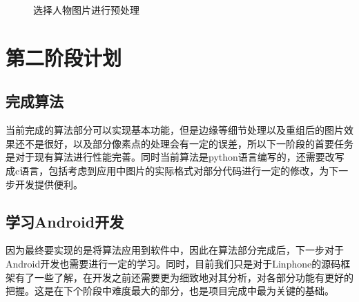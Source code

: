 \documentclass[14pt]{extarticle}
\newcommand{\<}{\langle}
\renewcommand{\>}{\rangle}
\theoremstyle{definition}
\begin{document}
\begin{itemize}
\begin{figure}[H]
{    }

    \caption{选择人物图片进行预处理}
\end{figure}
\end{itemize}

\section{第二阶段计划}
\subsection{完成算法}
\par{\qquad 当前完成的算法部分可以实现基本功能，但是边缘等细节处理以及重组后的图片效果还不是很好，以及部分像素点的处理会有一定的误差，所以下一阶段的首要任务是对于现有算法进行性能完善。同时当前算法是python语言编写的，还需要改写成c语言，包括考虑到应用中图片的实际格式对部分代码进行一定的修改，为下一步开发提供便利。}
\subsection{学习Android开发}
\par{\qquad 因为最终要实现的是将算法应用到软件中，因此在算法部分完成后，下一步对于Android开发也需要进行一定的学习。同时，目前我们只是对于Linphone的源码框架有了一些了解，在开发之前还需要更为细致地对其分析，对各部分功能有更好的把握。这是在下个阶段中难度最大的部分，也是项目完成中最为关键的基础。}
\end{document}
